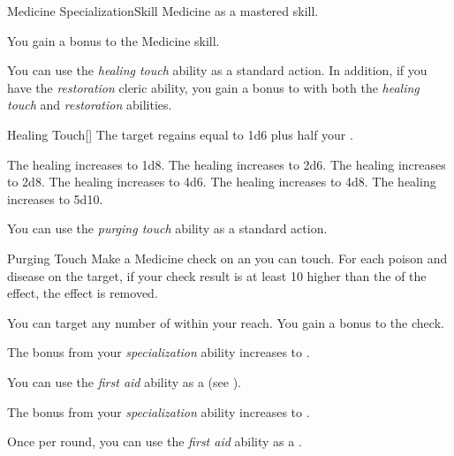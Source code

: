     \begin{feat}{Medicine Specialization}{Skill}
        \featpre Medicine as a mastered skill.

         You gain a  bonus to the Medicine skill.

         You can use the \textit{healing touch} ability as a standard action.
        In addition, if you have the \textit{restoration} cleric ability, you gain a  bonus to  with both the \textit{healing touch} and \textit{restoration} abilities.
        \begin{freeability}{Healing Touch}[]
            The target regains  equal to 1d6 plus half your .

            \rankline
             The healing increases to 1d8.
             The healing increases to 2d6.
             The healing increases to 2d8.
             The healing increases to 4d6.
             The healing increases to 4d8.
             The healing increases to 5d10.
        \end{freeability}

         You can use the \textit{purging touch} ability as a standard action.
        \begin{freeability}{Purging Touch}
            Make a Medicine check on an  you can touch.
            For each poison and disease on the target, if your check result is at least 10 higher than the  of the effect, the effect is removed.

            \rankline
             You can target any number of  within your reach.
             You gain a  bonus to the check.
        \end{freeability}

         The bonus from your \textit{specialization} ability increases to .

         You can use the \textit{first aid} ability as a  (see ).

         The bonus from your \textit{specialization} ability increases to .

         Once per round, you can use the \textit{first aid} ability as a .
    \end{feat}

